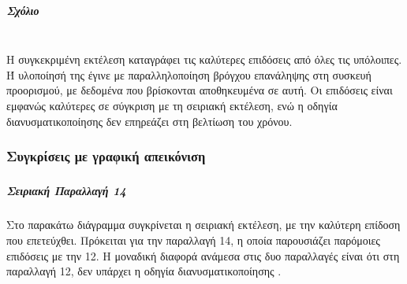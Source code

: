 \subparagraph{Σχόλιο}\ \\
Η συγκεκριμένη εκτέλεση καταγράφει τις καλύτερες επιδόσεις από όλες τις υπόλοιπες. Ή υλοποίησή της έγινε με παραλληλοποίηση βρόγχου επανάληψης στη συσκευή προορισμού, με δεδομένα που βρίσκονται αποθηκευμένα σε αυτή. Οι επιδόσεις είναι εμφανώς καλύτερες σε σύγκριση με τη σειριακή εκτέλεση, ενώ η οδηγία διανυσματικοποίησης \emph{} δεν επηρεάζει στη βελτίωση του χρόνου.

\newpage
\subsubsection{Συγκρίσεις με γραφική απεικόνιση}
\subparagraph{}

\paragraph{\emph{Σειριακή}  \emph{Παραλλαγή 14}}
\subparagraph{}
Στο παρακάτω διάγραμμα συγκρίνεται η σειριακή εκτέλεση, με την καλύτερη επίδοση που επετεύχθει.
Πρόκειται για την παραλλαγή 14, η οποία παρουσιάζει παρόμοιες επιδόσεις με την 12.
Η μοναδική διαφορά ανάμεσα στις δυο παραλλαγές είναι ότι στη παραλλαγή 12, δεν υπάρχει η οδηγία διανυσματικοποίησης \emph{}.\ \\ 
\ \\


